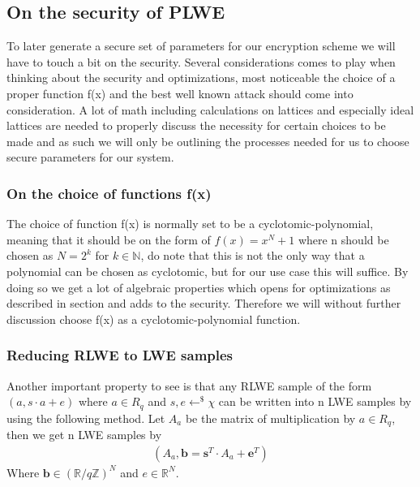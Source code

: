 \documentclass[../main.tex]{subfiles}
\begin{document}
\subsection{On the security of PLWE}
    To later generate a secure set of parameters for our encryption scheme we will have to touch a bit on the security.
    Several considerations comes to play when thinking about the security and optimizations, most noticeable the choice
    of a proper function f(x) and the best well known attack should come into consideration.
    A lot of math including calculations on lattices and especially ideal lattices are needed to properly discuss the
    necessity for certain choices to be made and as such we will only be outlining the processes needed for us to choose
    secure parameters for our system.

    \subsubsection{On the choice of functions f(x)}
        The choice of function f(x) is normally set to be a cyclotomic-polynomial, meaning that it should be on the form
        of $f(x) = x^N + 1$ where n should be chosen as $N = 2^k$ for $k \in \mathbb{N}$, do note that this is not the only
        way that a polynomial can be chosen as cyclotomic, but for our use case this will suffice.
        By doing so we get a lot of algebraic properties which opens for optimizations as described in section %
        and adds to the security.
        Therefore we will without further discussion choose f(x) as a cyclotomic-polynomial function.

    \subsubsection{Reducing RLWE to LWE samples}
        Another important property to see is that any RLWE sample of the form $(a, s \cdot a + e)$ 
		where $a \in R_q$ and $s, e \leftarrow^\$ \chi$ can be written into n LWE samples by using the following method.
        Let $A_a$ be the matrix of multiplication by $a \in R_q$, then we get n LWE samples by
        \begin{align*}
            (A_a, \textbf{b} = \textbf{s}^T \cdot A_a + \textbf{e}^T)
        \end{align*}
        Where $\textbf{b} \in (\mathbb{R} / q\mathbb{Z})^N$ and $e \in \mathbb{R}^N$.
\end{document}
